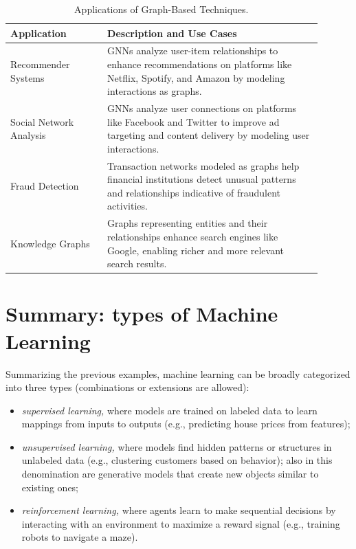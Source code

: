 \begin{table}[h]
\centering
\begin{tabular}{p{0.28\linewidth} p{0.62\linewidth}}
\toprule
\textbf{Application} & \textbf{Description and Use Cases} \\
\midrule
Recommender Systems &
GNNs analyze user-item relationships to enhance recommendations
on platforms like Netflix, Spotify, and Amazon by
modeling interactions as graphs. \\
\midrule
Social Network Analysis &
GNNs analyze user connections on platforms like Facebook
and Twitter to improve ad targeting and content delivery by
modeling user interactions. \\
\midrule
Fraud Detection &
Transaction networks modeled as graphs help financial institutions
detect unusual patterns and relationships indicative
of fraudulent activities. \\
\midrule
Knowledge Graphs &
Graphs representing entities and their relationships enhance
search engines like Google, enabling richer and more relevant
search results. \\
\bottomrule
\end{tabular}
\caption{Applications of Graph-Based Techniques.}
\label{tab:ch1-graph}
\end{table}

\section{Summary: types of Machine Learning}
\label{sec:ch1-summary}

Summarizing the previous examples, machine learning can be broadly categorized
into three types (combinations or extensions are allowed):
\begin{itemize}
  \item \emph{supervised learning,} where models are trained on labeled data to learn mappings
  from inputs to outputs (e.g., predicting house prices from features);
  \item \emph{unsupervised learning,} where models find hidden patterns or structures in
  unlabeled data (e.g., clustering customers based on behavior); also in this denomination
  are generative models that create new objects similar to existing
  ones;
  \item \emph{reinforcement learning,} where agents learn to make sequential decisions by
  interacting with an environment to maximize a reward signal (e.g., training
  robots to navigate a maze).
\end{itemize}

